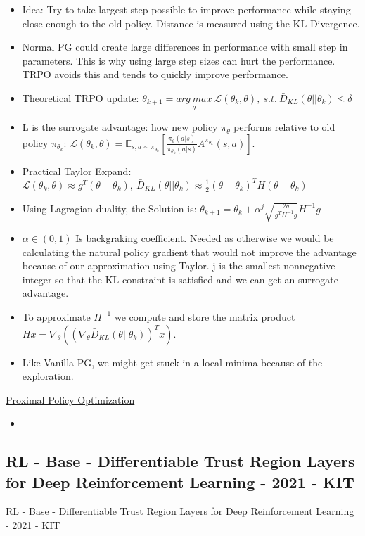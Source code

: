 \begin{itemize}[noitemsep,nolistsep]
	\item Idea: Try to take largest step possible to improve performance while staying close enough to the old policy. Distance is measured using the KL-Divergence.
	\item Normal PG could create large differences in performance with small step in parameters. This is why using large step sizes can hurt the performance. TRPO avoids this and tends to quickly improve performance.
	\item Theoretical TRPO update: $\theta_{k+1} = \underset{\theta}{arg\ max}\ \mathcal{L}(\theta_k, \theta),\ s.t.\ \bar{D}_{KL}(\theta || \theta_k) \leq \delta$
	\item L is the surrogate advantage: how new policy $\pi_\theta$ performs relative to old policy $\pi_{\theta_k}$: $\mathcal{L}(\theta_k, \theta) = \mathbb{E}_{s,a \sim \pi_{\theta_k}} [ \frac{\pi_\theta(a|s)}{\pi_{\theta_k}(a|s)} A^{\pi_{\theta_k}}(s,a)]$.
	\item Practical Taylor Expand: $\mathcal{L}(\theta_k, \theta) \approx g^T(\theta - \theta_k),\ \bar{D}_{KL}(\theta || \theta_k) \approx \frac{1}{2}(\theta - \theta_k)^T H(\theta - \theta_k)$
	\item Using Lagragian duality, the Solution is: $\theta_{k+1} = \theta_k + \alpha^j \sqrt{\frac{2\delta}{g^TH^{-1}g}}H^{-1}g$
	\item $\alpha \in (0,1)$ Is backgraking coefficient. Needed as otherwise we would be calculating the natural policy gradient that would not improve the advantage because of our approximation using Taylor. j is the smallest nonnegative integer so that the KL-constraint is satisfied and we can get an surrogate advantage.
	\item To approximate $H^{-1}$ we compute and store the matrix product $Hx = \nabla_\theta ((\nabla_\theta \bar{D}_{KL}(\theta || \theta_k))^Tx )$.
	\item Like Vanilla PG, we might get stuck in a local minima because of the exploration.
\end{itemize}
\href{https://spinningup.openai.com/en/latest/algorithms/ppo.html}{Proximal Policy Optimization}
\begin{itemize}[noitemsep,nolistsep]
	\item 
\end{itemize}

\subsection{RL - Base - Differentiable Trust Region Layers for Deep Reinforcement Learning - 2021 - KIT}
\href{https://arxiv.org/abs/2101.09207}{RL - Base - Differentiable Trust Region Layers for Deep Reinforcement Learning - 2021 - KIT}

